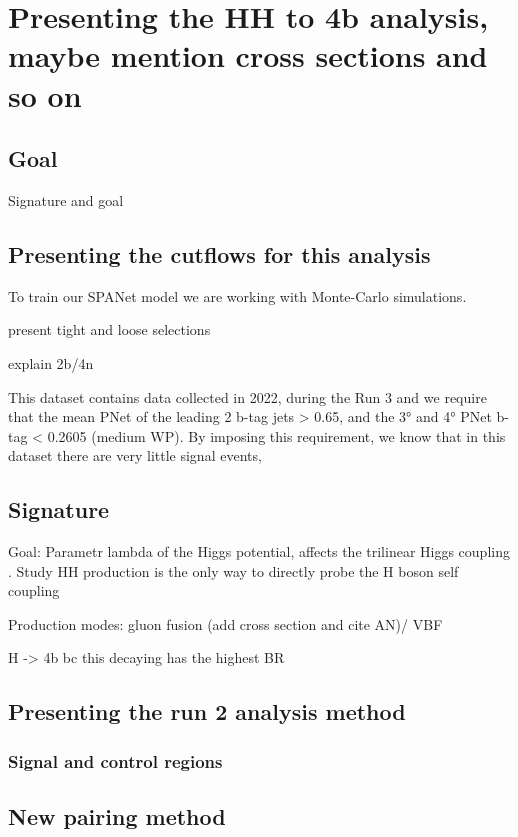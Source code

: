 \section{Presenting the HH to 4b analysis, maybe mention cross sections and so on} \label{section: HH4b}

\subsection{Goal}

Signature and goal

\subsection{Presenting the cutflows for this analysis} \label{subsection:cutflows}
To train our SPANet model we are working with Monte-Carlo simulations. 

present tight and loose selections

explain 2b/4n

This dataset contains data collected in 2022, during the Run 3 and we require that the mean PNet of the leading 2 b-tag jets > 0.65, and the 3° and 4° PNet b-tag < 0.2605 (medium WP). By imposing this requirement, we know that in this dataset there are very little signal events, 

\subsection{Signature}

Goal: Parametr lambda of the Higgs potential, affects the trilinear Higgs coupling . Study HH production is the only way to directly probe the H boson self coupling 

Production modes: gluon fusion (add cross section and cite AN)/ VBF

H -> 4b bc this decaying has the highest BR

\subsection{Presenting the run 2 analysis method}

\subsubsection{Signal and control regions}
\subsection{New pairing method}


